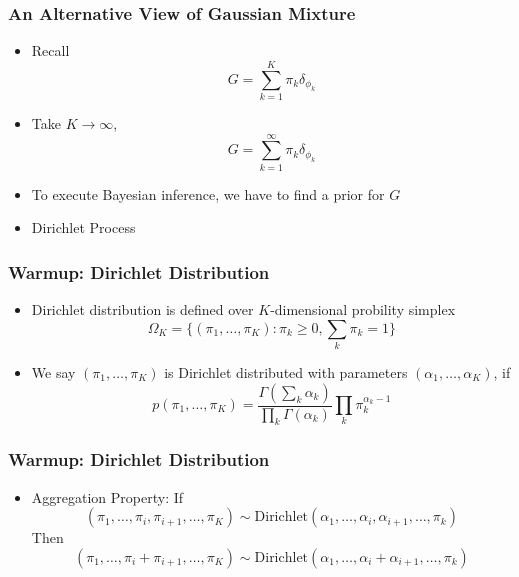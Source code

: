 \documentclass{beamer}
\begin{document}
\begin{frame}
	\frametitle{An Alternative View of Gaussian Mixture}
	\begin{itemize}
		\item Recall
		\[
			G = \sum_{k=1}^{K}\pi_k\delta_{\phi_k}
		\]
		\item Take $K \rightarrow \infty$,
		\[
			G = \sum_{k=1}^{\infty}\pi_k\delta_{\phi_k}
		\]
		\item To execute Bayesian inference, we have to find a prior for $G$
		\item Dirichlet Process
	\end{itemize}
\end{frame}

\begin{frame}
	\frametitle{Warmup: Dirichlet Distribution}
	\begin{itemize}
		\item Dirichlet distribution is defined over $K$-dimensional probility simplex
		\[
		\Omega_K=\{(\pi_1,\ldots,\pi_K): \pi_k\ge 0,\sum_k \pi_k =1 \}
		\]
		\item We say $(\pi_1,\ldots,\pi_K)$ is Dirichlet distributed with parameters $(\alpha_1, \ldots, \alpha_K)$, if
		\[
		p(\pi_1,\ldots,\pi_K)=\frac{\Gamma(\sum_k \alpha_k)}{\prod_k \Gamma(\alpha_k)}\prod_k \pi_k^{\alpha_k-1}
		\]
	\end{itemize}
\end{frame}

\begin{frame}
	\frametitle{Warmup: Dirichlet Distribution}
	\begin{itemize}
		\item {Aggregation Property:}
		If \[
			(\pi_1,\ldots,\pi_i, \pi_{i+1},\ldots, \pi_K) \sim \text{Dirichlet}(\alpha_1,\ldots,\alpha_i, \alpha_{i+1}, \ldots, \pi_k) 
		\]
		Then
		\[
		(\pi_1,\ldots,\pi_i+\pi_{i+1},\ldots, \pi_K) \sim \text{Dirichlet}(\alpha_1,\ldots,\alpha_i+ \alpha_{i+1}, \ldots, \pi_k) 
		\]
	\end{itemize}
\end{frame}
\end{document}
